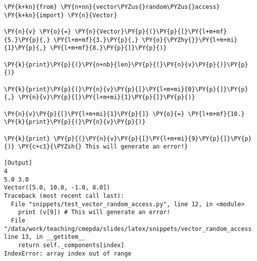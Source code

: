 \begin{Verbatim}[label=\makebox{\url{https://github.com/lucabaldini/cmepda/tree/master/slides/latex/snippets/test\_vector\_random\_access.py}},commandchars=\\\{\}]
\PY{k+kn}{from} \PY{n+nn}{vector\PYZus{}random\PYZus{}access} \PY{k+kn}{import} \PY{n}{Vector}

\PY{n}{v} \PY{o}{=} \PY{n}{Vector}\PY{p}{(}\PY{p}{[}\PY{l+m+mf}{5.}\PY{p}{,} \PY{l+m+mf}{3.}\PY{p}{,} \PY{o}{\PYZhy{}}\PY{l+m+mi}{1}\PY{p}{,} \PY{l+m+mf}{8.}\PY{p}{]}\PY{p}{)}

\PY{k}{print}\PY{p}{(}\PY{n+nb}{len}\PY{p}{(}\PY{n}{v}\PY{p}{)}\PY{p}{)}

\PY{k}{print}\PY{p}{(}\PY{n}{v}\PY{p}{[}\PY{l+m+mi}{0}\PY{p}{]}\PY{p}{,} \PY{n}{v}\PY{p}{[}\PY{l+m+mi}{1}\PY{p}{]}\PY{p}{)}

\PY{n}{v}\PY{p}{[}\PY{l+m+mi}{1}\PY{p}{]} \PY{o}{=} \PY{l+m+mf}{10.}
\PY{k}{print}\PY{p}{(}\PY{n}{v}\PY{p}{)}

\PY{k}{print} \PY{p}{(}\PY{n}{v}\PY{p}{[}\PY{l+m+mi}{9}\PY{p}{]}\PY{p}{)} \PY{c+c1}{\PYZsh{} This will generate an error!}

[Output]
4
5.0 3.0
Vector([5.0, 10.0, -1.0, 8.0])
Traceback (most recent call last):
  File "snippets/test_vector_random_access.py", line 12, in <module>
    print (v[9]) # This will generate an error!
  File "/data/work/teaching/cmepda/slides/latex/snippets/vector_random_access.py", line 13, in __getitem__
    return self._components[index]
IndexError: array index out of range
\end{Verbatim}